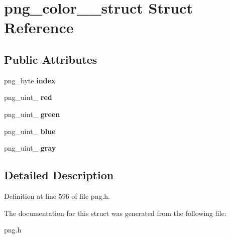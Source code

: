 \hypertarget{structpng__color__16__struct}{\section{png\+\_\+color\+\_\+\_\+struct Struct Reference}
\label{structpng__color__16__struct}
}
\subsection*{Public Attributes}
\begin{DoxyCompactItemize}
\item 
\hypertarget{structpng__color__16__struct_a44a918da0d9a50cf94fcad5a3c741ee0}{png\+\_\+byte {\bfseries index}}\label{structpng__color__16__struct_a44a918da0d9a50cf94fcad5a3c741ee0}

\item 
\hypertarget{structpng__color__16__struct_a069bad345aefbe4eab29fcc1d8af91e6}{png\+\_\+uint\+\_ {\bfseries red}}\label{structpng__color__16__struct_a069bad345aefbe4eab29fcc1d8af91e6}

\item 
\hypertarget{structpng__color__16__struct_af01259ffd46c78eff9b1ad584a295126}{png\+\_\+uint\+\_ {\bfseries green}}\label{structpng__color__16__struct_af01259ffd46c78eff9b1ad584a295126}

\item 
\hypertarget{structpng__color__16__struct_afd68833319d436582aa5911de7cdd46b}{png\+\_\+uint\+\_ {\bfseries blue}}\label{structpng__color__16__struct_afd68833319d436582aa5911de7cdd46b}

\item 
\hypertarget{structpng__color__16__struct_a660a572a0a2f4094408f2fecb61571ac}{png\+\_\+uint\+\_ {\bfseries gray}}\label{structpng__color__16__struct_a660a572a0a2f4094408f2fecb61571ac}

\end{DoxyCompactItemize}


\subsection{Detailed Description}


Definition at line 596 of file png.\+h.



The documentation for this struct was generated from the following file\+:\begin{DoxyCompactItemize}
\item 
png.\+h\end{DoxyCompactItemize}
